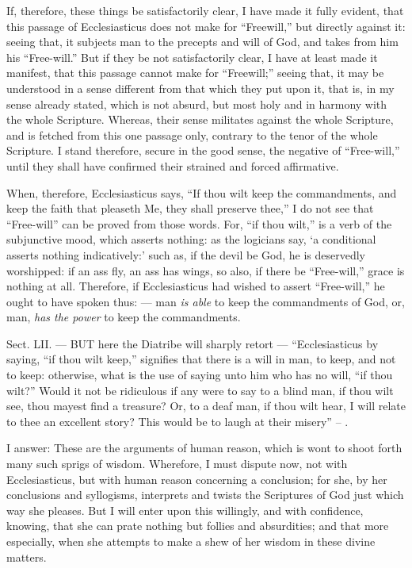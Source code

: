 If, therefore, these things be satisfactorily clear, I have made it fully evident, that this passage of Ecclesiasticus does not make for “Freewill,” but directly against it: seeing that, it subjects man to the precepts and will of God, and takes from him his “Free-will.” But if they be not satisfactorily clear, I have at least made it manifest, that this passage cannot make for “Freewill;” seeing that, it may be understood in a sense different from that which they put upon it, that is, in my sense already stated, which is not absurd, but most holy and in harmony with the whole Scripture. Whereas, their sense militates against the whole Scripture, and is fetched from this one passage only, contrary to the tenor of the whole Scripture. I stand therefore, secure in the good sense, the negative of “Free-will,” until they shall have confirmed their strained and forced affirmative.

When, therefore, Ecclesiasticus says, “If thou wilt keep the commandments, and keep the faith that pleaseth Me, they shall preserve thee,” I do not see that “Free-will” can be proved from those words. For, “if thou wilt,” is a verb of the subjunctive mood, which asserts nothing: as the logicians say, ‘a conditional asserts nothing indicatively:’ such as, if the devil be God, he is deservedly worshipped: if an ass fly, an ass has wings, so also, if there be “Free-will,” grace is nothing at all. Therefore, if Ecclesiasticus had wished to assert “Free-will,” he ought to have spoken thus: — man \emph{is able }to keep the commandments of God, or, man, \emph{has the power }to keep the commandments.


Sect. LII. — BUT here the Diatribe will sharply retort — “Ecclesiasticus by saying, “if thou wilt keep,” signifies that there is a will in man, to keep, and not to keep: otherwise, what is the use of saying unto him who has no will, “if thou wilt?” Would it not be ridiculous if any were to say to a blind man, if thou wilt see, thou mayest find a treasure? Or, to a deaf man, if thou wilt hear, I will relate to thee an excellent story? This would be to laugh at their misery” – .

I answer: These are the arguments of human reason, which is wont to shoot forth many such sprigs of wisdom. Wherefore, I must dispute now, not with Ecclesiasticus, but with human reason concerning a conclusion; for she, by her conclusions and syllogisms, interprets and twists the Scriptures of God just which way she pleases. But I will enter upon this willingly, and with confidence, knowing, that she can prate nothing but follies and absurdities; and that more especially, when she attempts to make a shew of her wisdom in these divine matters.

